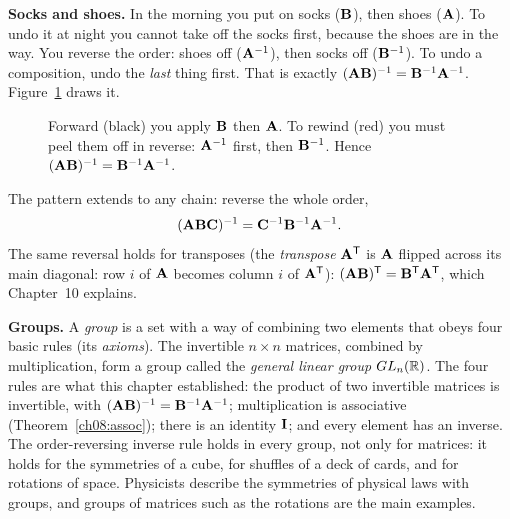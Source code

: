 \begin{intuitionbox}
\textbf{Socks and shoes.} In the morning you put on socks ($\mathbf{B}$), then shoes
($\mathbf{A}$). To undo it at night you cannot take off the socks first, because the shoes
are in the way. You reverse the order: shoes off ($\mathbf{A}^{-1}$), then socks off ($\mathbf{B}^{-1}$).
To undo a composition, undo the \emph{last} thing first. That is exactly
$(\mathbf{A}\mathbf{B})^{-1} = \mathbf{B}^{-1}\mathbf{A}^{-1}$. Figure~\ref{ch08:socksshoes} draws it.
\end{intuitionbox}

\begin{figure}[H]
\centering
{}
\caption{Forward (black) you apply $\mathbf{B}$ then $\mathbf{A}$. To rewind (red) you must
peel them off in reverse: $\mathbf{A}^{-1}$ first, then $\mathbf{B}^{-1}$. Hence
$(\mathbf{A}\mathbf{B})^{-1} = \mathbf{B}^{-1}\mathbf{A}^{-1}$.}
\label{ch08:socksshoes}
\end{figure}

The pattern extends to any chain: reverse the whole order,
\[
(\mathbf{A}\mathbf{B}\mathbf{C})^{-1} = \mathbf{C}^{-1}\mathbf{B}^{-1}\mathbf{A}^{-1}.
\]
The same reversal holds for transposes (the \emph{transpose} $\mathbf{A}^{\mathsf{T}}$ is $\mathbf{A}$
flipped across its main diagonal: row $i$ of $\mathbf{A}$ becomes column $i$ of $\mathbf{A}^{\mathsf{T}}$): $(\mathbf{A}\mathbf{B})^{\mathsf{T}} = \mathbf{B}^{\mathsf{T}}\mathbf{A}^{\mathsf{T}}$, which Chapter~10
explains.

\begin{connectionbox}
\textbf{Groups.} A \emph{group} is a set with a way of combining two elements that obeys
four basic rules (its \emph{axioms}). The invertible $n\times n$ matrices, combined by
multiplication, form a group called the \emph{general linear group} $GL_n(\mathbb{R})$. The four
rules are what this chapter established: the product of two invertible matrices is
invertible, with $(\mathbf{A}\mathbf{B})^{-1} = \mathbf{B}^{-1}\mathbf{A}^{-1}$; multiplication is
associative (Theorem~\ref{ch08:assoc}); there is an identity $\mathbf{I}$; and every
element has an inverse. The order-reversing inverse rule holds in every group, not
only for matrices: it holds for the symmetries of a cube, for shuffles of a deck of
cards, and for rotations of space. Physicists describe the symmetries of physical laws
with groups, and groups of matrices such as the rotations are the main examples.
\end{connectionbox}

